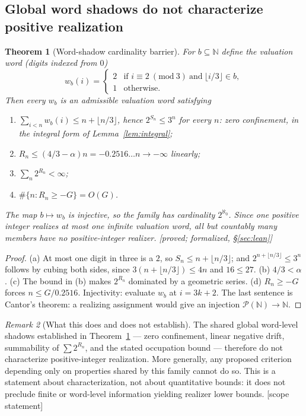 \documentclass[11pt]{article}
\theoremstyle{plain}
\newtheorem{theorem}{Theorem}[section]
\theoremstyle{definition}
\theoremstyle{remark}
\newtheorem{remark}[theorem]{Remark}
\newcommand{\al}{\alpha}
\newcommand{\status}[1]{\textsf{\footnotesize[#1]}}
\begin{document}
\subsection{Global word shadows do not characterize positive realization}\label{sec:cardinality}

\begin{theorem}[Word-shadow cardinality barrier]\label{thm:cardinality}
For $b\subseteq\mathbb{N}$ define the valuation word (digits indexed from $0$)
\[
w_b(i)=\begin{cases} 2 & \text{if } i\equiv2\ (\mathrm{mod}\ 3)\ \text{and}\ \lfloor i/3\rfloor\in b,\\
1 & \text{otherwise.}\end{cases}
\]
Then every $w_b$ is an admissible valuation word satisfying
\begin{enumerate}[label=(\alph*),leftmargin=2em]
\item $\sum_{i<n}w_b(i)\le n+\lfloor n/3\rfloor$, hence $2^{S_n}\le3^n$ for every $n$: zero
  confinement, in the integral form of Lemma~\ref{lem:integral};
\item $R_n\le(4/3-\al)n=-0.2516\ldots n\to-\infty$ linearly;
\item $\sum_n 2^{R_n}<\infty$;
\item $\#\{n:R_n\ge-G\}=O(G)$.
\end{enumerate}
The map $b\mapsto w_b$ is injective, so the family has cardinality $2^{\aleph_0}$. Since one
positive integer realizes at most one infinite valuation word, all but countably many members have
\emph{no} positive-integer realizer. \status{proved; formalized, \S\ref{sec:lean}}
\end{theorem}

\begin{proof}
(a) At most one digit in three is a $2$, so $S_n\le n+\lfloor n/3\rfloor$; and
$2^{n+\lfloor n/3\rfloor}\le3^n$ follows by cubing both sides, since
$3(n+\lfloor n/3\rfloor)\le4n$ and $16\le27$. (b) $4/3<\al$. (c) The bound in (b) makes
$2^{R_n}$ dominated by a geometric series. (d) $R_n\ge-G$ forces $n\le G/0.2516$. Injectivity:
evaluate $w_b$ at $i=3k+2$. The last sentence is Cantor's theorem: a realizing assignment would
give an injection $\mathcal{P}(\mathbb{N})\to\mathbb{N}$.
\end{proof}

\begin{remark}[What this does and does not establish]\label{rem:cardscope}
The shared global word-level shadows established in Theorem~\ref{thm:cardinality} --- zero
confinement, linear negative drift, summability of $\sum2^{R_n}$, and the stated occupation bound
--- therefore do not characterize positive-integer realization. More generally, any proposed
criterion depending only on properties shared by this family cannot do so. This is a statement
about characterization, not about quantitative bounds: it does not preclude finite or word-level
information yielding realizer lower bounds. \status{scope statement}
\end{remark}
\end{document}
